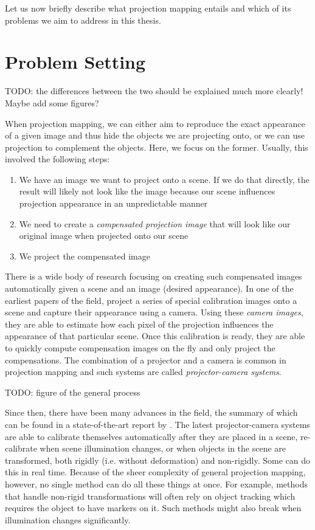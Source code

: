 Let us now briefly describe what projection mapping entails and which of its problems we aim to address in this thesis.

\section{Problem Setting}
\label{section:intro-problem_setting}

{\color{red} TODO: the differences between the two should be explained much more clearly! Maybe add some figures?}

When projection mapping, we can either aim to reproduce the exact appearance of a given image and thus hide the objects we are projecting onto, or we can use projection to complement the objects. Here, we focus on the former. Usually, this involved the following steps:

\begin{enumerate}
    \item We have an image we want to project onto a scene. If we do that directly, the result will likely not look like the image because our scene influences projection appearance in an unpredictable manner
    \item We need to create a \textit{compensated projection image} that will look like our original image when projected onto our scene
    \item We project the compensated image
\end{enumerate}

There is a wide body of research focusing on creating such compensated images automatically given a scene and an image (desired appearance). In one of the earliest papers of the field, \citet*{Grossberg2004} project a series of special calibration images onto a scene and capture their appearance using a camera. Using these \textit{camera images}, they are able to estimate how each pixel of the projection influences the appearance of that particular scene. Once this calibration is ready, they are able to quickly compute compensation images on the fly and only project the compensations. The combination of a projector and a camera is common in projection mapping and such systems are called \textit{projector-camera systems}.

{\color{red} TODO: figure of the general process}

Since then, there have been many advances in the field, the summary of which can be found in a state-of-the-art report by \citet*{Grundhofer2018}. The latest projector-camera systems are able to calibrate themselves automatically after they are placed in a scene, re-calibrate when scene illumination changes, or when objects in the scene are transformed, both rigidly (i.e. without deformation) and non-rigidly. Some can do this in real time. Because of the sheer complexity of general projection mapping, however, no single method can do all these things at once. For example, methods that handle non-rigid transformations will often rely on object tracking which requires the object to have markers on it. Such methods might also break when illumination changes significantly.


